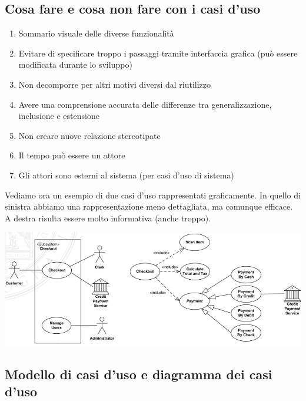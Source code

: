 \documentclass{article}
\begin{document}
\subsection*{Cosa fare e cosa non fare con i casi d'uso}
\large
\begin{enumerate}
    \renewcommand{\labelenumi}{-}
    \item Sommario visuale delle diverse funzionalità
    \item Evitare di specificare troppo i passaggi tramite interfaccia grafica (può essere modificata durante lo sviluppo)
    \item Non decomporre per altri motivi diversi dal riutilizzo
    \item Avere una comprensione accurata delle differenze tra generalizzazione, inclusione e estensione
    \item Non creare nuove relazione stereotipate
    \item Il tempo può essere un attore
    \item Gli attori sono esterni al sistema (per casi d'uso di sistema)
\end{enumerate}
Vediamo ora un esempio di due casi d'uso rappresentati graficamente. In quello di sinistra abbiamo una rappresentazione meno dettagliata, ma comunque efficace. A destra risulta essere molto informativa (anche troppo).
\begin{center}
    \includegraphics[width=1\textwidth]{foto 8.png}
\end{center}

\subsection*{Modello di casi d'uso e diagramma dei casi d'uso}
\large
\end{document}
